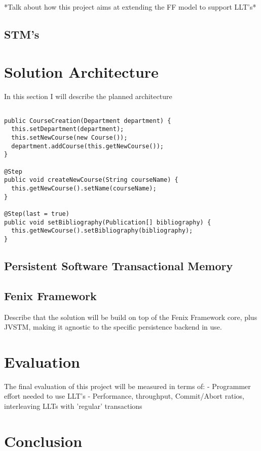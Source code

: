 \documentclass{llncs}
\begin{document}
*Talk about how this project aims at extending the FF model to support LLT's*

\subsection{STM's}

\section{Solution Architecture}

In this section I will describe the planned architecture 

\begin{lstlisting}

public CourseCreation(Department department) {
  this.setDepartment(department);
  this.setNewCourse(new Course());
  department.addCourse(this.getNewCourse());
}

@Step
public void createNewCourse(String courseName) {
  this.getNewCourse().setName(courseName);
}

@Step(last = true)
public void setBibliography(Publication[] bibliography) {
  this.getNewCourse().setBibliography(bibliography);
}
\end{lstlisting}

\subsection{Persistent Software Transactional Memory}

\subsection{Fenix Framework}

Describe that the solution will be build on top of the Fenix Framework
core, plus JVSTM, making it agnostic to the specific persistence
backend in use. 

\section{Evaluation}

The final evaluation of this project will be measured in terms of:
- Programmer effort needed to use LLT's
- Performance, throughput, Commit/Abort ratios, interleaving LLTs with
'regular' transactions

\section{Conclusion}



\end{document}
